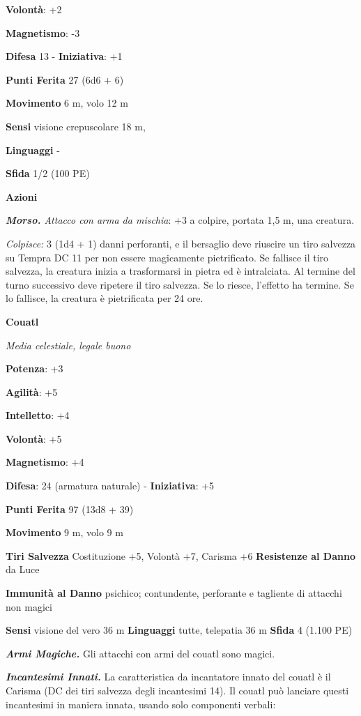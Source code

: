 \begin{multicols}{2}
\textbf{Volontà}: +2

\textbf{Magnetismo}: -3

\textbf{Difesa} 13 - \textbf{Iniziativa}: +1

\textbf{Punti Ferita} 27 (6d6 + 6)

\textbf{Movimento} 6 m, volo 12 m

\textbf{Sensi} visione crepuscolare 18 m, 

\textbf{Linguaggi} -

\textbf{Sfida} 1/2 (100 PE)

\textbf{Azioni}

\emph{\textbf{Morso.} Attacco con arma da mischia}: +3 a colpire,
portata 1,5 m, una creatura.

\emph{Colpisce:} 3 (1d4 + 1) danni perforanti, e il bersaglio deve
riuscire un tiro salvezza su Tempra DC 11 per non essere
magicamente pietrificato. Se fallisce il tiro salvezza, la creatura
inizia a trasformarsi in pietra ed è intralciata. Al termine del turno
successivo deve ripetere il tiro salvezza. Se lo riesce, l'effetto ha
termine. Se lo fallisce, la creatura è pietrificata per 24 ore.



\textbf{Couatl}

\emph{Media celestiale, legale buono}

\textbf{Potenza}: +3

\textbf{Agilità}: +5

\textbf{Intelletto}: +4

\textbf{Volontà}: +5

\textbf{Magnetismo}: +4

\textbf{Difesa}: 24 (armatura naturale) - \textbf{Iniziativa}: +5

\textbf{Punti Ferita} 97 (13d8 + 39)

\textbf{Movimento} 9 m, volo 9 m

\textbf{Tiri Salvezza} Costituzione +5, Volontà +7, Carisma +6
\textbf{Resistenze al Danno} da Luce

\textbf{Immunità al Danno} psichico; contundente, perforante e tagliente
di attacchi non magici

\textbf{Sensi} visione del vero 36 m
\textbf{Linguaggi} tutte, telepatia 36 m \textbf{Sfida} 4 (1.100 PE)

\emph{\textbf{Armi Magiche.}} Gli attacchi con armi del couatl sono
magici.

\emph{\textbf{Incantesimi Innati.}} La caratteristica da incantatore
innato del couatl è il Carisma (DC dei tiri salvezza degli incantesimi
14). Il couatl può lanciare questi incantesimi in maniera innata, usando
solo componenti verbali:


\end{multicols}
